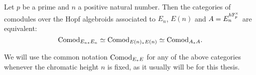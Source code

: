 \begin{proposition}
    \label{ch0:prop:comod-EE-are-equivalent}
    Let $p$ be a prime and $n$ a positive natural number. Then the categories of comodules over the Hopf algebroids associated to $E_n$, $E(n)$ and $A=E_n^{h\mathbb{F}_p^\times}$ are equivalent: 
    \[\mathrm{Comod}_{E_{n *}E_n} \simeq \mathrm{Comod}_{E(n)_*E(n)}\simeq \mathrm{Comod}_{A_*A}.\]
\end{proposition}

\begin{notation}
    We will use the common notation $\mathrm{Comod}_{E_*E}$ for any of the above categories whenever the chromatic height $n$ is fixed, as it usually will be for this thesis. 
\end{notation}